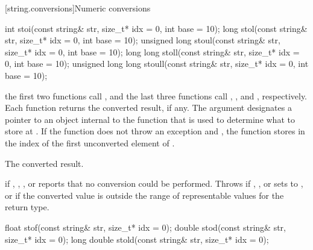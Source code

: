 [string.conversions]{Numeric conversions}

%
%
%
%
%
\begin{itemdecl}
int stoi(const string& str, size_t* idx = 0, int base = 10);
long stol(const string& str, size_t* idx = 0, int base = 10);
unsigned long stoul(const string& str, size_t* idx = 0, int base = 10);
long long stoll(const string& str, size_t* idx = 0, int base = 10);
unsigned long long stoull(const string& str, size_t* idx = 0, int base = 10);
\end{itemdecl}

\begin{itemdescr}
\pnum
\effects the first two functions call ,
and the last three functions call ,
, and , respectively. Each function returns the converted result, if any. The
argument  designates a pointer to an object internal to the function
that is used to determine what to store at . If the function does
not throw an exception and , the function stores in 
the index of the first unconverted element of .

\pnum
\returns The converted result.

\pnum
\throws {} if , ,
, or  reports that no conversion could be
performed. Throws  if , ,
 or  sets  to ,
or if the converted value is outside the range of representable values
for the return type.
\end{itemdescr}

%
%
%
\begin{itemdecl}
float stof(const string& str, size_t* idx = 0);
double stod(const string& str, size_t* idx = 0);
long double stold(const string& str, size_t* idx = 0);
\end{itemdecl}

